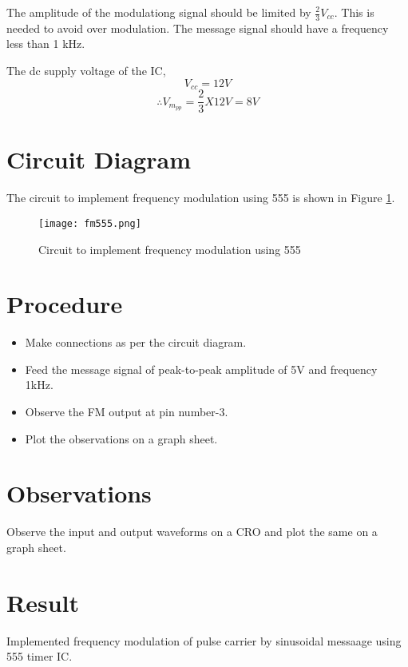The amplitude of the modulationg signal should be limited by $\frac{2}{3}V_{cc}$. This is needed to avoid over modulation. The message signal should have a frequency less than 1 kHz.

The dc supply voltage of the IC, 
\begin{equation}
V_{cc}=12 V
\end{equation}
\begin{equation}
\therefore V_{m_{pp}}=\frac{2}{3}X12 V=8V
\end{equation}
\section*{Circuit Diagram}
The circuit to implement frequency modulation using 555 is shown in Figure \ref{fm555ckt}.

\begin{figure}
\texttt{[image: fm555.png]}
\caption{Circuit to implement frequency modulation using 555}
\label{fm555ckt}
\end{figure}

\section*{Procedure}

\begin{itemize}
\item
Make connections as per the circuit diagram.

\item

Feed the message signal of peak-to-peak amplitude of 5V and frequency 1kHz.
\item Observe the FM output at pin number-3.

\item
Plot the observations on a graph sheet.
\end{itemize}


\section*{Observations}
Observe the input and output waveforms on a CRO and plot the same on a graph sheet.
\section*{Result}
Implemented frequency modulation of pulse carrier by sinusoidal messaage using 555 timer IC.




